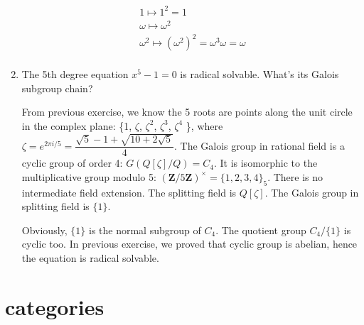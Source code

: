 \documentclass[UTF8]{article}
\begin{document}
\begin{enumerate}
\begin{mdframed}
\[
\begin{array}{l}
1 \mapsto 1^2 = 1 \\
\omega \mapsto \omega^2 \\
\omega^2 \mapsto (\omega^2)^2 = \omega^3 \omega = \omega \\
\end{array}
\]

\end{mdframed}

\item {The 5th degree equation $x^5 - 1 = 0$ is radical solvable. What's its Galois subgroup chain?}

From previous exercise, we know the 5 roots are points along the unit circle in the complex plane: \{1, $\zeta$, $\zeta^2$, $\zeta^3$, $\zeta^4$ \}, where $\zeta = e^{2 \pi i / 5} = \dfrac{\sqrt{5} - 1 + \sqrt{10 + 2 \sqrt{5}}}{4}$. The Galois group in rational field is a cyclic group of order 4: $G(Q[\zeta]/Q) = C_4$. It is isomorphic to the multiplicative group modulo 5: $(\pmb{Z}/5\pmb{Z})^{\times} = \{1, 2, 3, 4 \}_5$. There is no intermediate field extension. The splitting field is $Q[\zeta]$. The Galois group in splitting field is $\{1\}$.

Obviously, $\{1\}$ is the normal subgroup of $C_4$. The quotient group $C_4/\{1\}$ is cyclic too. In previous exercise, we proved that cyclic group is abelian, hence the equation is radical solvable.

\end{enumerate}

\section{categories}
\end{document}
